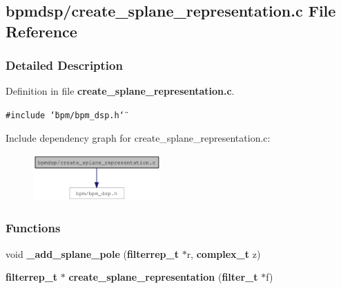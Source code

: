 \subsection{bpmdsp/create\_\-splane\_\-representation.c File Reference}
\label{create__splane__representation_8c}


\subsubsection{Detailed Description}


Definition in file {\bf create\_\-splane\_\-representation.c}.

{\tt \#include \char`\"{}bpm/bpm\_\-dsp.h\char`\"{}}\par


Include dependency graph for create\_\-splane\_\-representation.c:\nopagebreak
\begin{figure}[H]
\begin{center}
\leavevmode
\includegraphics[width=138pt]{create__splane__representation_8c__incl}
\end{center}
\end{figure}
\subsubsection*{Functions}
\begin{CompactItemize}
\item 
void \textbf{\_\-add\_\-splane\_\-pole} ({\bf filterrep\_\-t} $\ast$r, {\bf complex\_\-t} z)\label{create__splane__representation_8c_4350e23bc8b050bf533531a9c5000b7b}

\item 
{\bf filterrep\_\-t} $\ast$ {\bf create\_\-splane\_\-representation} ({\bf filter\_\-t} $\ast$f)
\end{CompactItemize}
